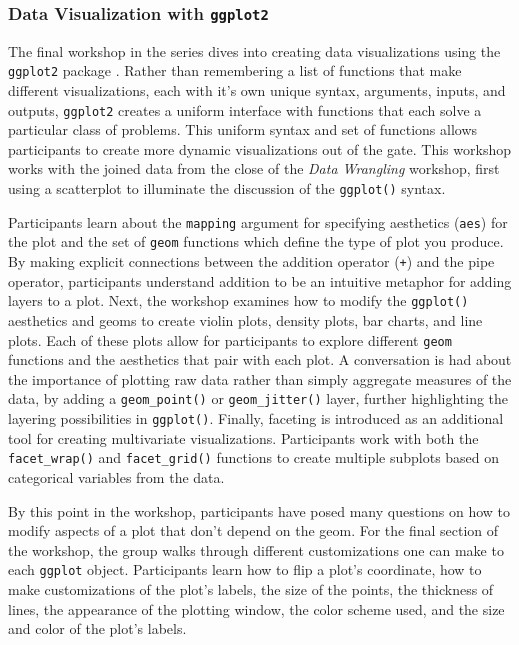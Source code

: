 \documentclass[12pt]{article}
\begin{document}
\subsubsection{Data Visualization with \texttt{ggplot2}}
\label{sec:vizual} 

\quad The final workshop in the series dives into creating data visualizations
using the \texttt{ggplot2} package \citep{ggplot}. Rather than remembering a
list of functions that make different visualizations, each with it's own unique
syntax, arguments, inputs, and outputs, \texttt{ggplot2} creates a uniform
interface with functions that each solve a particular class of problems. This
uniform syntax and set of functions allows participants to create more dynamic 
visualizations out of the gate. This workshop works with the joined data from 
the close of the \emph{Data Wrangling} workshop, first using a scatterplot to 
illuminate the discussion of the \texttt{ggplot()} syntax.


\quad Participants learn about the \texttt{mapping} argument for specifying
aesthetics (\texttt{aes}) for the plot and the set of \texttt{geom} functions 
which define the type of plot you produce. By making explicit connections
between the addition operator (\texttt{+}) and the pipe operator, participants
understand addition to be an intuitive metaphor for adding layers to a plot. 
Next, the workshop examines how to modify the \texttt{ggplot()} aesthetics and 
geoms to create violin plots, density plots, bar charts, and line plots. Each of
these plots allow for participants to explore different \texttt{geom} functions
and the aesthetics that pair with each plot. A conversation is had about the
importance of plotting raw data rather than simply aggregate measures of the
data, by adding a \texttt{geom\_point()} or \texttt{geom\_jitter()} layer, 
further highlighting the layering possibilities in \texttt{ggplot()}. Finally,
faceting is introduced as an additional tool for creating multivariate
visualizations. Participants work with both the \texttt{facet\_wrap()} and 
\texttt{facet\_grid()} functions to create multiple subplots based on
categorical variables from the data. 

\quad By this point in the workshop, participants have posed many questions on
how to modify aspects of a plot that don't depend on the geom. For the final 
section of the workshop, the group walks through different customizations one 
can make to each \texttt{ggplot} object. Participants learn how to flip a plot's 
coordinate, how to make customizations of the plot's labels, the size of the
points, the thickness of lines, the appearance of the plotting window, the color
scheme used, and the size and color of the plot's labels. 
\end{document}
